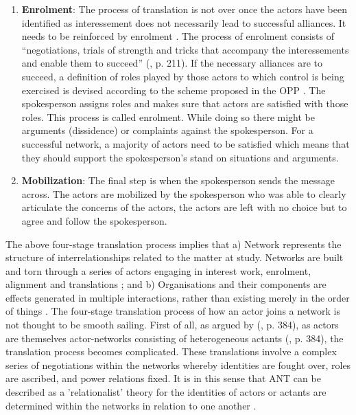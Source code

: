 \begin{enumerate}
  \item \textbf{Enrolment}: The process of translation is not over once the actors have been identified as interessement does not necessarily lead to successful alliances. It needs to be reinforced by enrolment \cite{callon1986sociology}. The process of enrolment consists of “negotiations, trials of strength and tricks that accompany the interessements and enable them to succeed” (\cite{callon1986sociology}, p. 211). If the necessary alliances are to succeed, a definition of roles played by those actors to which control is being exercised is devised according to the scheme proposed in the OPP \cite{linde2003actor, law1986heterogeneity}. The spokesperson assigns roles and makes sure that actors are satisfied with those roles. This process is called enrolment. While doing so there might be arguments (dissidence) or complaints against the spokesperson. For a successful network, a majority of actors need to be satisfied which means that they should support the spokesperson’s stand on situations and arguments.
  \item \textbf{Mobilization}: The final step is when the spokesperson sends the message across. The actors are mobilized by the spokesperson who was able to clearly articulate the concerns of the actors, the actors are left with no choice but to agree and follow the spokesperson.
\end{enumerate}

The above four-stage translation process implies that a) Network represents the structure of interrelationships related to the matter at study. Networks are built and torn through a series of actors engaging in interest work, enrolment, alignment and translations \cite{law1992notes}; and b) Organisations and their components are effects generated in multiple interactions, rather than existing merely in the order of things \cite{latour1987science, latour2005reassembling, law1992notes}. The four-stage translation process of how an actor joins a network is not thought to be smooth sailing. First of all, as argued by (\cite{law1992notes}, p. 384), as actors are themselves actor-networks consisting of heterogeneous actants (\cite{law1992notes}, p. 384), the translation process becomes complicated. These translations involve a complex series of negotiations within the networks whereby identities are fought over, roles are ascribed, and power relations fixed. It is in this sense that ANT can be described as a 'relationalist' theory for the identities of actors or actants are determined within the networks in relation to one another \cite{law1992notes}.

